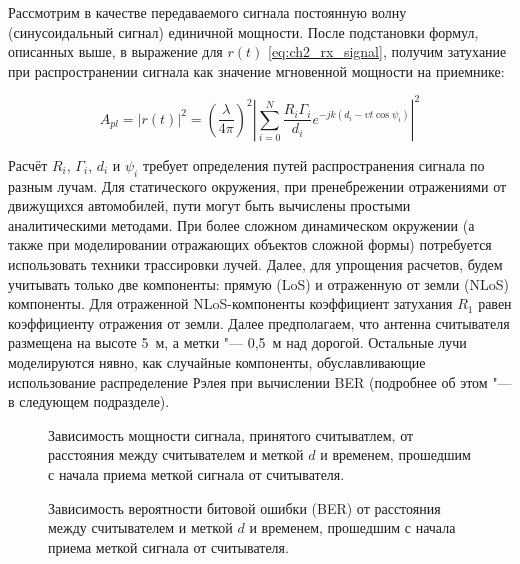 Рассмотрим в качестве передаваемого сигнала постоянную волну (синусоидальный сигнал) единичной мощности. После подстановки формул, описанных выше, в выражение для $r(t)$ \eqref{eq:ch2_rx_signal}, получим затухание при распространении сигнала как значение мгновенной мощности на приемнике: 

\begin{equation}
	A_{pl} = |r(t)|^2 = \left(\frac{\lambda}{4\pi}\right)^2
		\left|\sum\limits_{i=0}^{N} \frac{R_i\Gamma_i}{d_i} 
		e^{-jk(d_i-\upsilon t \cos{\psi_i})}\right|^2
	\label{eq:ch2_pathloss}
\end{equation}

Расчёт $R_i$, $\Gamma_i$, $d_i$ и $\psi_i$ требует определения путей распространения сигнала по разным лучам. Для статического окружения, при пренебрежении отражениями от движущихся автомобилей, пути могут быть вычислены простыми аналитическими методами. При более сложном динамическом окружении (а также при моделировании отражающих объектов сложной формы) потребуется использовать техники трассировки лучей. Далее, для упрощения расчетов, будем учитывать только две компоненты: прямую (LoS) и отраженную от земли (NLoS) компоненты. Для отраженной NLoS-компоненты коэффициент затухания $R_1$ равен коэффициенту отражения от земли. Далее предполагаем, что антенна считывателя размещена на высоте 5~м, а метки "--- 0,5~м над дорогой. Остальные лучи моделируются нявно, как случайные компоненты,  обуславливающие использование распределение Рэлея при вычислении BER (подробнее об этом "--- в следующем подразделе). 

\begin{figure}[!t]
  \caption[Зависимость мощности сигнала, принятого считывателем, от расстояния и времени]{Зависимость мощности сигнала, принятого считыватлем, от расстояния между считывателем и меткой $d$ и временем, прошедшим с начала приема меткой сигнала от считывателя.}
	\label{fig:ch2_power_doppler}
\end{figure}

\begin{figure}[!t]
	\caption[Зависимость BER от расстояния и времени]{Зависимость вероятности битовой ошибки (BER) от расстояния между считывателем и меткой $d$ и временем, прошедшим с начала приема меткой сигнала от считывателя.}
	\label{fig:ch2_ber_doppler}
\end{figure}



